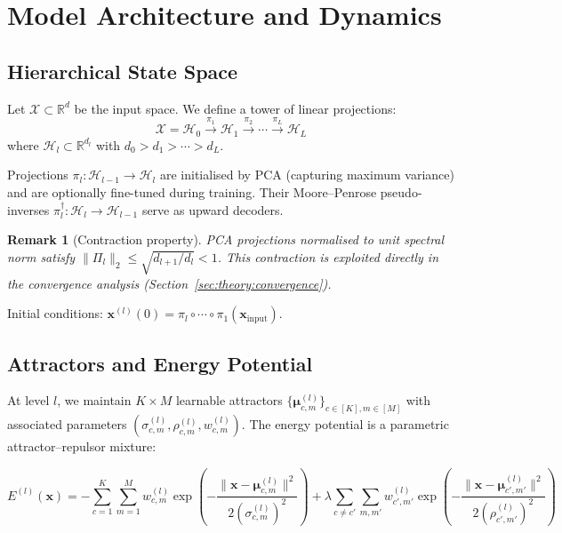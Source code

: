 \documentclass[11pt,a4paper]{article}
\newtheorem{remark}[theorem]{Remark}
\begin{document}
\section{Model Architecture and Dynamics}

\subsection{Hierarchical State Space}

Let $\mathcal{X} \subset \mathbb{R}^d$ be the input space.  We define a tower of linear
projections:
\begin{equation}
  \mathcal{X} = \mathcal{H}_0
  \xrightarrow{\pi_1} \mathcal{H}_1
  \xrightarrow{\pi_2} \cdots
  \xrightarrow{\pi_L} \mathcal{H}_L
\end{equation}
where $\mathcal{H}_l \subset \mathbb{R}^{d_l}$ with $d_0 > d_1 > \cdots > d_L$.

Projections $\pi_l : \mathcal{H}_{l-1} \to \mathcal{H}_l$ are initialised by PCA (capturing
maximum variance) and are optionally fine-tuned during training.  Their Moore--Penrose
pseudo-inverses $\pi_l^\dagger : \mathcal{H}_l \to \mathcal{H}_{l-1}$ serve as upward
decoders.

\begin{remark}[Contraction property]
PCA projections normalised to unit spectral norm satisfy
$\|\Pi_l\|_2 \le \sqrt{d_{l+1}/d_l} < 1$.
This contraction is exploited directly in the convergence analysis (Section~\ref{sec:theory:convergence}).
\end{remark}

Initial conditions: $\mathbf{x}^{(l)}(0) = \pi_l \circ \cdots \circ \pi_1(\mathbf{x}_{\mathrm{input}})$.

\subsection{Attractors and Energy Potential}

At level $l$, we maintain $K \times M$ learnable attractors
$\{\boldsymbol{\mu}^{(l)}_{c,m}\}_{c \in [K], m \in [M]}$
with associated parameters $(\sigma^{(l)}_{c,m}, \rho^{(l)}_{c,m}, w^{(l)}_{c,m})$.
The energy potential is a parametric attractor--repulsor mixture:

\begin{equation}
  E^{(l)}(\mathbf{x}) = -\sum_{c=1}^{K} \sum_{m=1}^{M} w_{c,m}^{(l)}
    \exp\!\left(-\frac{\|\mathbf{x} - \boldsymbol{\mu}_{c,m}^{(l)}\|^2}
                      {2(\sigma_{c,m}^{(l)})^2}\right)
  + \lambda \sum_{c \ne c'} \sum_{m,m'} w_{c',m'}^{(l)}
    \exp\!\left(-\frac{\|\mathbf{x} - \boldsymbol{\mu}_{c',m'}^{(l)}\|^2}
                      {2(\rho_{c',m'}^{(l)})^2}\right)
\label{eq:energy}
\end{equation}
\end{document}
